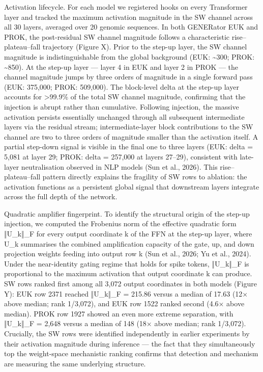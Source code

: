 \documentclass[11pt]{article}
\begin{document}
Activation lifecycle. For each model we registered hooks on every
Transformer layer and tracked the maximum activation magnitude in the SW
channel across all 30 layers, averaged over 20 genomic sequences. In
both GENERator EUK and PROK, the post-residual SW channel magnitude
follows a characteristic rise--plateau--fall trajectory (Figure X).
Prior to the step-up layer, the SW channel magnitude is
indistinguishable from the global background (EUK: \textasciitilde300;
PROK: \textasciitilde850). At the step-up layer --- layer 4 in EUK and
layer 2 in PROK --- the channel magnitude jumps by three orders of
magnitude in a single forward pass (EUK: 375,000; PROK: 509,000). The
block-level delta at the step-up layer accounts for \textgreater99.9\%
of the total SW channel magnitude, confirming that the injection is
abrupt rather than cumulative. Following injection, the massive
activation persists essentially unchanged through all subsequent
intermediate layers via the residual stream; intermediate-layer block
contributions to the SW channel are two to three orders of magnitude
smaller than the activation itself. A partial step-down signal is
visible in the final one to three layers (EUK: delta = 5,081 at layer
29; PROK: delta = 257,000 at layers 27--29), consistent with late-layer
neutralisation observed in NLP models (Sun et al., 2026). This
rise--plateau--fall pattern directly explains the fragility of SW rows
to ablation: the activation functions as a persistent global signal that
downstream layers integrate across the full depth of the network.

Quadratic amplifier fingerprint. To identify the structural origin of
the step-up injection, we computed the Frobenius norm of the effective
quadratic form ‖U\_k‖\_F for every output coordinate k of the FFN at the
step-up layer, where U\_k summarises the combined amplification capacity
of the gate, up, and down projection weights feeding into output row k
(Sun et al., 2026; Yu et al., 2024). Under the near-identity gating
regime that holds for spike tokens, ‖U\_k‖\_F is proportional to the
maximum activation that output coordinate k can produce. SW rows ranked
first among all 3,072 output coordinates in both models (Figure Y): EUK
row 2371 reached ‖U\_k‖\_F = 215.86 versus a median of 17.63 (12× above
median; rank 1/3,072), and EUK row 1522 ranked second (4.6× above
median). PROK row 1927 showed an even more extreme separation, with
‖U\_k‖\_F = 2,648 versus a median of 148 (18× above median; rank
1/3,072). Crucially, the SW rows were identified independently in
earlier experiments by their activation magnitude during inference ---
the fact that they simultaneously top the weight-space mechanistic
ranking confirms that detection and mechanism are measuring the same
underlying structure.
\end{document}
